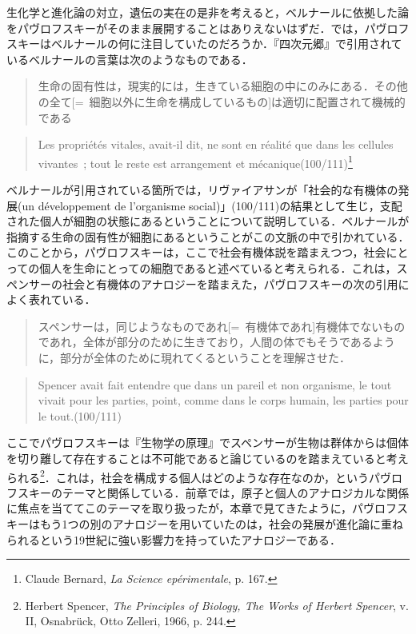生化学と進化論の対立，遺伝の実在の是非を考えると，ベルナールに依拠した論をパヴロフスキーがそのまま展開することはありえないはずだ．では，パヴロフスキーはベルナールの何に注目していたのだろうか．『四次元郷』で引用されているベルナールの言葉は次のようなものである．
\begin{quote}
生命の固有性は，現実的には，生きている細胞の中にのみにある．その他の全て[=~細胞以外に生命を構成しているもの]は適切に配置されて機械的である
\end{quote}
\begin{quote}
  Les propriétés vitales, avait-il dit, ne sont en réalité que dans les cellules vivantes~; tout le reste est arrangement et mécanique(100/111)\footnote{Claude Bernard, \emph{La Science epérimentale}, p. 167.}
\end{quote}
ベルナールが引用されている箇所では，リヴァイアサンが「社会的な有機体の発展(un développement de l'organisme social)」(100/111)の結果として生じ，支配された個人が細胞の状態にあるということについて説明している．ベルナールが指摘する生命の固有性が細胞にあるということがこの文脈の中で引かれている．このことから，パヴロフスキーは，ここで社会有機体説を踏まえつつ，社会にとっての個人を生命にとっての細胞であると述べていると考えられる．これは，スペンサーの社会と有機体のアナロジーを踏まえた，パヴロフスキーの次の引用によく表れている．
\begin{quote}
スペンサーは，同じようなものであれ[=~有機体であれ]有機体でないものであれ，全体が部分のために生きており，人間の体でもそうであるように，部分が全体のために現れてくるということを理解させた．
\end{quote}
\begin{quote}
Spencer avait fait entendre que dans un pareil et non organisme, le tout vivait pour les parties, point, comme dans le corps humain, les parties pour le tout.(100/111)
\end{quote}
ここでパヴロフスキーは『生物学の原理』でスペンサーが生物は群体からは個体を切り離して存在することは不可能であると論じているのを踏まえていると考えられる\footnote{Herbert Spencer, \emph{The Principles of Biology, The Works of Herbert Spencer}, v. II, Osnabrück, Otto Zelleri, 1966, p. 244.}．これは，社会を構成する個人はどのような存在なのか，というパヴロフスキーのテーマと関係している．前章では，原子と個人のアナロジカルな関係に焦点を当ててこのテーマを取り扱ったが，本章で見てきたように，パヴロフスキーはもう1つの別のアナロジーを用いていたのは，社会の発展が進化論に重ねられるという19世紀に強い影響力を持っていたアナロジーである．

